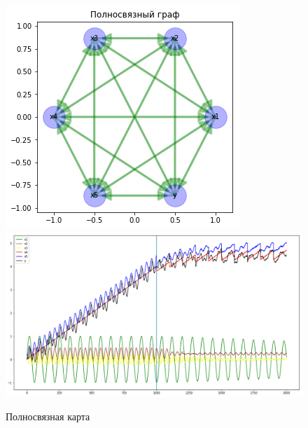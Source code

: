 \begin{figure}[t]
	\centering
	\includegraphics[width=0.7\columnwidth]{./img/lstmfcm_fc.png}
	\includegraphics[width=0.9\columnwidth]{./img/lstmfcm_fc_prediction.png}
	\caption{Полносвязная карта}
	\label{img:lstmfcm_fc}
\end{figure}

